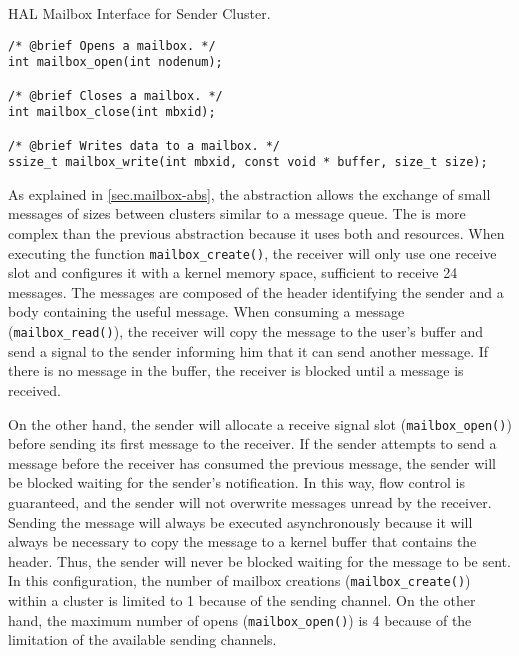 \begin{listing}[!tb]
\caption{HAL Mailbox Interface for Sender Cluster.}
\label{code:mailbox-sender}
\begin{verbatim}
/* @brief Opens a mailbox. */
int mailbox_open(int nodenum);

/* @brief Closes a mailbox. */
int mailbox_close(int mbxid);

/* @brief Writes data to a mailbox. */
ssize_t mailbox_write(int mbxid, const void * buffer, size_t size);
\end{verbatim}
\end{listing}

				As explained in \autoref{sec.mailbox-abs}, the \mailbox abstraction
				allows the exchange of small messages of sizes between clusters similar
				to a \posix message queue.
				The \mailbox is more complex than the previous abstraction because it
				uses both \dnoc and \cnoc resources.
				When executing the function \texttt{mailbox\_create()}, the receiver
				will only use one \dnoc receive slot and configures it with a kernel
				memory space, sufficient to receive 24 messages.
				The messages are composed of the header identifying the sender
				and a body containing the useful message.
				When consuming a message (\texttt{mailbox\_read()}), the receiver
				will copy the message to the user's buffer and send a signal
				to the sender informing him that it can send another message.
				If there is no message in the buffer, the receiver is blocked
				until a message is received.

				On the other hand, the sender will allocate a receive signal slot (\texttt{mailbox\_open()})
				before sending its first message to the receiver.
				If the sender attempts to send a message before the receiver has consumed
				the previous message, the sender will be blocked waiting for the sender's notification.
				In this way, flow control is guaranteed, and the sender will not overwrite
				messages unread by the receiver.
				Sending the message will always be executed asynchronously
				because it will always be necessary to copy the message to
				a kernel buffer that contains the header.
				Thus, the sender will never be blocked waiting for the message to be sent.
				In this configuration, the number of mailbox creations (\texttt{mailbox\_create()})
				within a cluster is limited to 1 because of the \cnoc sending channel.
				On the other hand, the maximum number of opens (\texttt{mailbox\_open()}) is
				4 because of the limitation of the available \dnoc sending channels.

